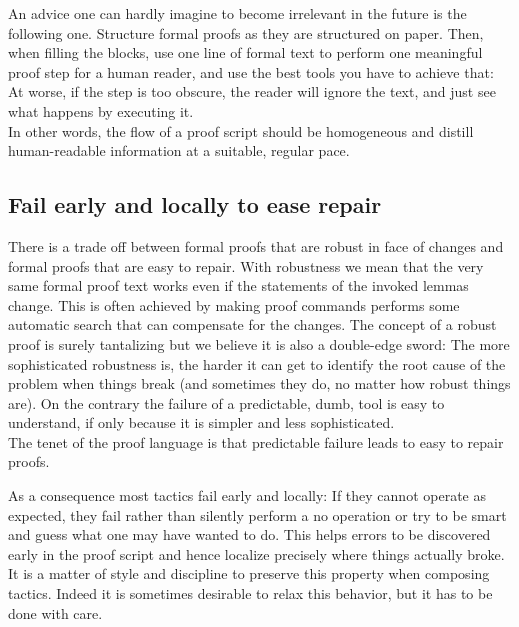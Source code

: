 An advice one can hardly imagine to become irrelevant in the future
is the following one. Structure formal proofs as they are structured on paper.
Then, when filling the blocks, use one line of formal text to perform one
meaningful proof step for a human reader, and use the best tools you have to
achieve that: At worse, if the step is too obscure, the reader will
ignore the text, and just see what happens by executing it.\\
In other words, the flow of a proof script should be homogeneous and
distill human-readable information at a suitable, regular pace.


\subsection{Fail early and locally to ease repair}

There is a trade off between formal proofs that are robust in face of
changes and formal proofs that are easy to repair. 
With robustness we mean that the very same formal proof text
works even if the statements of the invoked lemmas change.
This is often achieved by making proof commands performs some automatic
search that can compensate for the changes.
The concept of a robust proof is surely tantalizing but we
believe it is also a double-edge sword: The more
sophisticated robustness is, the harder it can get to identify the
root cause of the problem when things break (and sometimes they do, no
matter how robust things are).  On the
contrary the failure of a predictable, dumb, tool is easy
to understand, if only because it is simpler and less
sophisticated.\\
The tenet of the \mcbSSR{} proof language is that
predictable failure leads to easy to repair proofs.

As a consequence most \mcbSSR{} tactics fail early and locally: If they cannot
operate as expected, they fail rather than silently perform a no
operation or try to be smart and guess what one may have wanted to
do.  This helps errors to be discovered early in the proof script and
hence localize precisely where things actually broke. It is a matter
of style and discipline to preserve this property when composing
\mcbSSR{} tactics.  Indeed it is sometimes desirable to relax this
behavior, but it has to be done with care.

